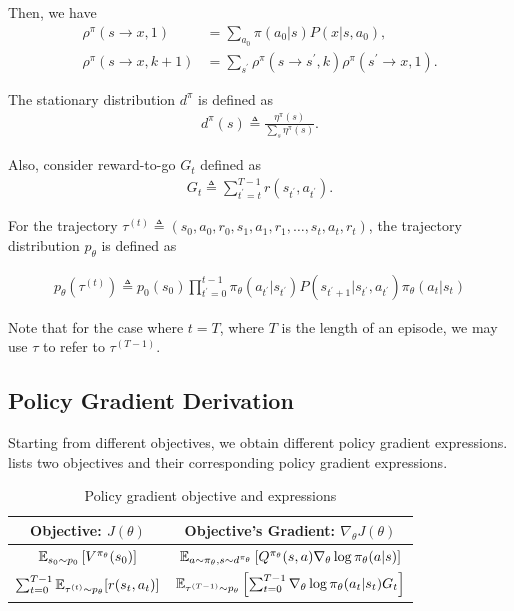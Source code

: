 \documentclass{article}
\begin{document}
Then, we have
\begin{align*}
    \rho^\pi(s\to x, 1) &= \sum_{a_0} \pi(a_0|s) P(x|s, a_0),\\
    \rho^\pi(s\to x, k+1) &= \sum_{s^\prime}\rho^\pi(s\to s^\prime, k) \rho^\pi(s^\prime\to x, 1).
\end{align*}
\begin{tcolorbox}[breakable,enhanced,colback=green!3!white,colframe=green!30!black]
The stationary distribution $d^\pi$ is defined as
\begin{align*}
    d^\pi(s) \triangleq \frac{\eta^\pi(s)}{\sum_s \eta^\pi(s)}.
\end{align*}

Also, consider reward-to-go $G_t$ defined as
\begin{align*}
    G_t \triangleq \sum_{t^\prime= t}^{T-1} r(s_{t^\prime}, a_{t^\prime}).
\end{align*}

For the trajectory $\tau^{(t)}\triangleq (s_0, a_0, r_0, s_1, a_1, r_1, \ldots, s_t, a_t, r_t)$, the trajectory distribution $p_\theta$ is defined as

\begin{align*}
    p_\theta(\tau^{(t)}) \triangleq p_0(s_0)\prod_{t^\prime = 0}^{t-1} \pi_\theta(a_{t^\prime}|s_{t^\prime})P(s_{t^\prime+1}|s_{t^\prime}, a_{t^\prime}) \pi_\theta(a_t|s_t)
\end{align*}

Note that for the case where $t = T$, where $T$ is the length of an episode, we may use $\tau$ to refer to $\tau^{(T-1)}$.

\end{tcolorbox}


\subsection{Policy Gradient Derivation}\label{sec:pg_derivation}

Starting from different objectives, we obtain different policy gradient expressions. lists two objectives and their corresponding policy gradient expressions.
\begin{table}[H]
    \centering
\begin{tabular}{c c}
  \textbf{Objective:} $J(\theta)$ & \textbf{Objective's Gradient:} $\nabla_\theta J(\theta)$ \\
  \hline
   ${\mathbb E}_{s_0\sim p_0}\left[V^{\pi_\theta}(s_0)\right]$ & ${\mathbb E}_{a \sim\pi _\theta, s\sim d^{\pi_\theta}}\left[Q^{\pi_\theta}(s,a)\nabla_\theta \log \pi_\theta(a|s)\right]$ \\
   \arrayrulecolor{gray}\hline
    $\sum_{t=0}^{T-1} {\mathbb E}_{\tau^{(t)} \sim p_\theta}[r(s_t, a_t)]$ & ${\mathbb E}_{\tau^{(T-1)} \sim p_\theta} \left[ \sum_{t=0}^{T-1} \nabla_\theta \log \pi_\theta(a_t \vert s_t) G_t\right]$ \\  
\end{tabular}
\caption{Policy gradient objective and expressions}
\label{table:pg_exp}
\end{table}
\end{document}
